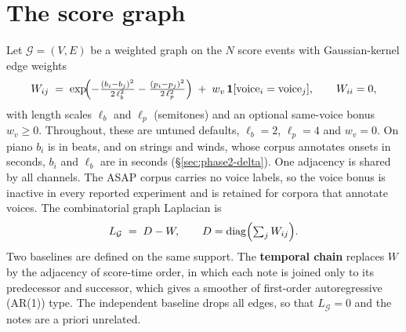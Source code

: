 \documentclass[11pt,a4paper]{report}
\newcommand{\graph}{\mathcal{G}}
\newcommand{\Lg}{L_{\graph}}
\newcommand{\diag}{\operatorname{diag}}
\begin{document}
\section{The score graph}\label{sec:scoregraph}
Let $\graph = (V, E)$ be a weighted graph on the $N$ score events with
Gaussian-kernel edge weights
\begin{equation}
  W_{ij} \;=\; \exp\!\Bigl( -\tfrac{(b_i - b_j)^2}{2\,\ell_b^2} - \tfrac{(p_i - p_j)^2}{2\,\ell_p^2} \Bigr)
  \;+\; w_v\, \mathbf{1}[\text{voice}_i = \text{voice}_j],
  \qquad W_{ii} = 0,
  \label{eq:adjacency}
\end{equation}
with length scales $\ell_b$ and $\ell_p$ (semitones) and an optional
same-voice bonus $w_v \ge 0$. Throughout, these are untuned defaults,
$\ell_b = 2$, $\ell_p = 4$ and $w_v = 0$. On piano $b_i$ is in beats, and
on strings and winds, whose corpus annotates onsets in seconds, $b_i$ and
$\ell_b$ are in seconds (\S\ref{sec:phase2-delta}). One adjacency is shared
by all channels. The ASAP corpus carries no voice
labels, so the voice bonus is inactive in every reported experiment and is
retained for corpora that annotate voices. The combinatorial graph Laplacian
is
\begin{equation}
  \Lg \;=\; D - W, \qquad D = \diag\Bigl(\textstyle\sum_j W_{ij}\Bigr).
  \label{eq:laplacian}
\end{equation}
Two baselines are defined on the same support. The \textbf{temporal chain}
replaces $W$ by the adjacency of score-time order, in which each note is
joined only to its predecessor and successor, which gives a smoother of
first-order autoregressive (AR(1)) type. The independent baseline drops all edges, so that
$\Lg = 0$ and the notes are a priori unrelated.
\end{document}

